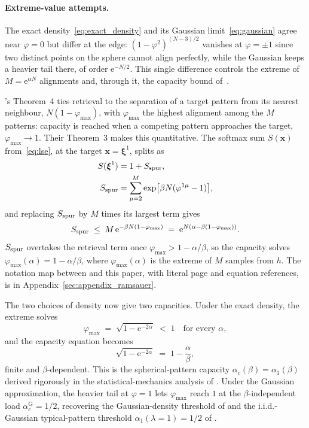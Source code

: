 \documentclass[letterpaper]{article} %
\newcommand{\bxi}{\boldsymbol{\xi}}
\newcommand{\e}{{\mathrm{e}}}
\newcommand{\Bnet}{\beta}
\newcommand{\acGauss}{\alpha_c^{\mathrm{G}}}
\begin{document}
\paragraph{Extreme-value attempts.}
The exact density~\eqref{eq:exact_density} and its Gaussian
limit~\eqref{eq:gaussian} agree near $\varphi = 0$ but differ at
the edge: $(1-\varphi^2)^{(N-3)/2}$ vanishes at $\varphi = \pm 1$
since two distinct points on the sphere cannot align perfectly,
while the Gaussian keeps a heavier tail there, of order $\e^{-N/2}$.
This single difference controls the extreme of
$M = \e^{\alpha N}$ alignments and, through it, the capacity bound
of~\citet{ramsauer2021hopfield}.

\citeauthor{ramsauer2021hopfield}'s Theorem~4 ties retrieval to the
separation of a target pattern from its nearest neighbour,
$N(1-\varphi_{\max})$, with $\varphi_{\max}$ the highest alignment
among the $M$ patterns: capacity is reached when a competing pattern
approaches the target, $\varphi_{\max} \to 1$.  Their Theorem~3 makes
this quantitative.  The softmax sum
$S(\bm x)$ from~\eqref{eq:lse}, at the target
$\bm x = \bxi^1$, splits as
\begin{align}
S(\bxi^1) &= 1 + S_{\rm spur},
\label{eq:softmax_sum}\\
S_{\rm spur} &= \sum_{\mu=2}^{M}\exp\!\big[\Bnet N(\varphi^{1\mu} - 1)\big],
\label{eq:spur_sum}
\end{align}
and replacing $S_{\rm spur}$ by $M$ times its largest term gives
\begin{equation}
S_{\rm spur} \;\le\; M\,\e^{-\Bnet N(1-\varphi_{\max})}
   \;=\; \e^{N(\alpha - \Bnet(1-\varphi_{\max}))}.
\label{eq:ramsauer_bound}
\end{equation}
$S_{\rm spur}$ overtakes the retrieval term once
$\varphi_{\max} > 1 - \alpha/\Bnet$, so the capacity solves
$\varphi_{\max}(\alpha) = 1 - \alpha/\Bnet$, where
$\varphi_{\max}(\alpha)$ is the extreme of $M$ samples from $h$.
The notation map between \citeauthor{ramsauer2021hopfield} and this
paper, with literal page and equation references, is in
Appendix~\ref{sec:appendix_ramsauer}.

The two choices of density now give two capacities.  Under the exact
density, the extreme solves
\begin{equation}
\varphi_{\max} \;=\; \sqrt{1 - \e^{-2\alpha}} \;<\; 1 \quad\text{for every }\alpha,
\label{eq:varphi_max}
\end{equation}
and the capacity equation becomes
\begin{equation}
\sqrt{1 - \e^{-2\alpha}} \;=\; 1 - \frac{\alpha}{\Bnet},
\label{eq:ramsauer_capacity}
\end{equation}
finite and $\Bnet$-dependent.  This is the spherical-pattern
capacity $\alpha_c(\Bnet) = \alpha_1(\Bnet)$ derived rigorously in
the statistical-mechanics analysis of
\citet{lucibello2024exponential}.  Under the Gaussian
approximation, the heavier tail at $\varphi = 1$ lets
$\varphi_{\max}$ reach $1$ at the $\Bnet$-independent load
$\acGauss = 1/2$, recovering the Gaussian-density threshold of
\citet{icml2026theory} and the i.i.d.-Gaussian typical-pattern
threshold $\alpha_1(\lambda{=}1) = 1/2$ of
\citet{lucibello2024exponential}.
\end{document}
